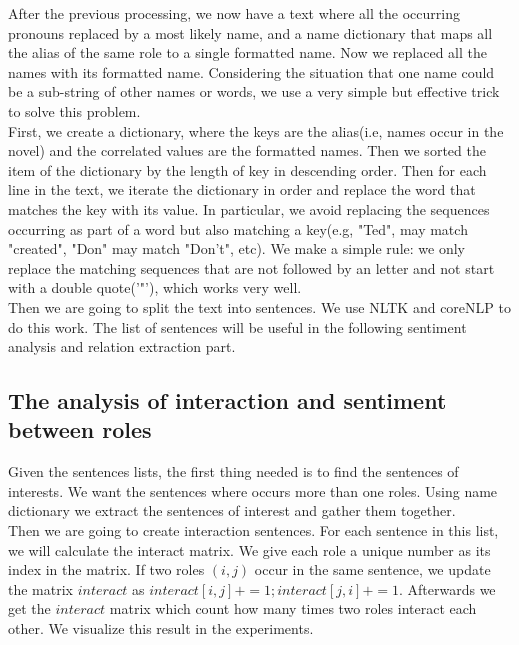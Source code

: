 \documentclass[11pt]{article}
\begin{document}
After the previous processing, we now have a text where all the occurring pronouns replaced by a most likely name, and a name dictionary that maps all the alias of the same role to a single formatted name. Now we replaced all the names with its formatted name. Considering the situation that one name could be a sub-string of other names or words, we use a very simple but effective trick to solve this problem. \\
First, we create a dictionary, where the keys are the alias(i.e, names occur in the novel) and the correlated values are the formatted names. Then we sorted the item of the dictionary by the length of key in descending order. Then for each line in the text, we iterate the dictionary in order and replace the word that matches the key with its value. In particular, we avoid replacing the sequences occurring as part of a word but also matching a key(e.g, "Ted", may match "created", "Don" may match "Don't", etc). We make a simple rule: we only replace the matching sequences that are not followed by an letter and not start with a double quote('"'), which works very well. \\ 

Then we are going to split the text into sentences. We use NLTK and coreNLP to do this work. The list of sentences will be useful in the following sentiment analysis and relation extraction part.

\subsection{The analysis of interaction and sentiment between roles} %
Given the sentences lists, the first thing needed is to find the sentences of interests. We want the sentences where occurs more than one roles. Using name dictionary we extract the sentences of interest and gather them together. \\

Then we are going to create interaction sentences. For each sentence in this list, we will calculate the interact matrix. We give each role a unique number as its index in the matrix. If two roles $(i, j)$ occur in the same sentence, we update the matrix $interact$ as $interact[i, j] += 1; interact[j, i] += 1$. Afterwards we get the $interact$ matrix which count how many times two roles interact each other. We visualize this result in the experiments.\\
\end{document}
